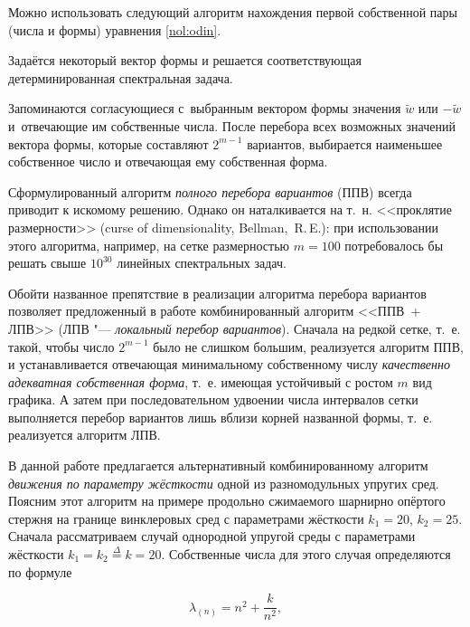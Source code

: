Можно использовать следующий алгоритм нахождения первой собственной пары (числа и формы) уравнения \eqref{nol:odin}. 

Задаётся некоторый вектор формы и решается соответствующая детерминированная спектральная задача. 

Запоминаются согласующиеся с~выбранным вектором формы значения $\tilde{w}$ или $-\tilde{w}$ и~отвечающие им  собственные числа. После перебора всех возможных значений вектора формы, которые составляют $2^{m-1}$ вариантов, выбирается наименьшее собственное число и отвечающая ему собственная форма. 



Сформулированный алгоритм \textit{полного перебора вариантов} (ППВ) всегда приводит к искомому решению. Однако он наталкивается на т.~н. <<проклятие размерности>> (curse of dimensionality, Bellman,~R.\,E.): при использовании этого алгоритма, например, на сетке размерностью $m=100$ потребовалось бы решать свыше $10^{30}$ линейных спектральных задач.



Обойти названное препятствие в реализации алгоритма перебора вариантов позволяет предложенный в работе \cite{mich-1} комбинированный алгоритм <<ППВ~{+} ЛПВ>> (ЛПВ "--- \textit{локальный перебор вариантов}). Сначала на редкой сетке, т.~е. такой, чтобы число $2^{m-1}$ было не слишком большим, реализуется алгоритм ППВ, и устанавливается отвечающая минимальному собственному числу \textit{качественно адекватная собственная форма}, т.~е. имеющая устойчивый с ростом $m$ вид графика. А затем при последовательном удвоении числа интервалов сетки выполняется перебор вариантов лишь вблизи корней названной формы, т.~е. реализуется алгоритм ЛПВ.



В данной работе предлагается альтернативный комбинированному алгоритм \textit{движения по параметру жёсткости} одной из разномодульных упругих сред. Поясним этот алгоритм на примере продольно сжимаемого шарнирно опёртого стержня на границе винклеровых сред с параметрами жёсткости $k_1=20$, $k_2=25$. Сначала рассматриваем случай однородной упругой среды с параметрами жёсткости $k_1=k_2\stackrel{\Delta}{=}k=20$. Собственные числа для этого случая определяются по формуле~\cite{mich-2} 

\begin{equation}\label{nol:tri}

\lambda_{(n)}=n^2+\frac{k}{n^2},

\end{equation}

